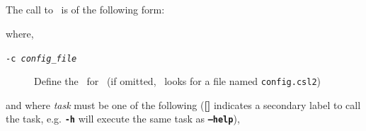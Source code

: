 \vspace*{4mm}

\subsection{\label{sec:command-line-arguments}}

The call to \CNAME\ is of the following form: 

\texttt{}

where, 

\begin{description}
  \item [\texttt{-c \emph{config\_file}}] Define the \config\ for \CNAME\ (if omitted, \CNAME\ looks for a file named \texttt{config.csl2})
\end{description}

and where \emph{task} must be one of the following (\textbf{[]} indicates a secondary label to call the task, e.g. \textbf{\texttt{-h}} will execute the same task as \textbf{\texttt{--help}}),

